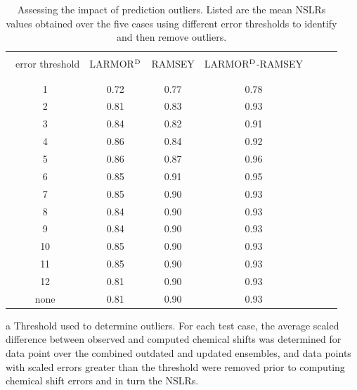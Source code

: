 \documentclass[fleqn,10pt]{wlscirep}
\begin{document}
\begin{table}[h]
\centering
\begin{threeparttable}
\begin{tabular}{c c c c c c c }
\hline
\\
\tnote{a} \ error threshold & LARMOR$^{\rm D}$ & RAMSEY  &  LARMOR$^{\rm D}$-RAMSEY\\
\\
\hline
\\
1      & 0.72 & 0.77 & 0.78 \\
2      & 0.81 & 0.83 & 0.93 \\
3      & 0.84 & 0.82 & 0.91 \\
4      & 0.86 & 0.84 & 0.92 \\
5      & 0.86 & 0.87 & 0.96 \\
6      & 0.85 & 0.91 & 0.95 \\
7      & 0.85 & 0.90 & 0.93 \\
8      & 0.84 & 0.90 & 0.93 \\
9      & 0.84 & 0.90 & 0.93 \\
10     & 0.85 & 0.90 & 0.93 \\
11     & 0.85 & 0.90 & 0.93 \\
12     & 0.81 & 0.90 & 0.93 \\                         
none   & 0.81 & 0.90 & 0.93 \\
\hline
\end{tabular}
\begin{tablenotes}
\item[a] Threshold used to determine outliers. For each test case, the average scaled difference between observed and computed chemical shifts was determined for data point over the combined outdated and updated ensembles, and data points with scaled errors greater than the threshold were removed prior to computing chemical shift errors and in turn the NSLRs.
\end{tablenotes}
\end{threeparttable}
\caption{\label{tab:outliers} Assessing the impact of prediction outliers. Listed are the mean NSLRs values obtained over the five cases using different error thresholds to identify and then remove outliers.}
\end{table}
\end{document}
